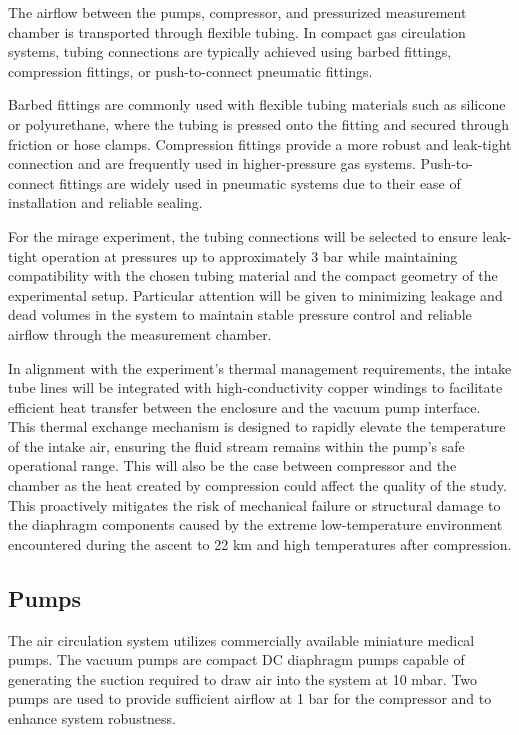 \documentclass[
  a4paper,
  11pt,
  openany,
  parskip,
  toc=totoc,
  listof=totoc,
  bibliography=totoc
]{scrreprt}
\begin{document}
The airflow between the pumps, compressor, and pressurized measurement chamber is transported through flexible tubing. In compact gas circulation systems, tubing connections are typically achieved using barbed fittings, compression fittings, or push-to-connect pneumatic fittings.

Barbed fittings are commonly used with flexible tubing materials such as silicone or polyurethane, where the tubing is pressed onto the fitting and secured through friction or hose clamps. Compression fittings provide a more robust and leak-tight connection and are frequently used in higher-pressure gas systems. Push-to-connect fittings are widely used in pneumatic systems due to their ease of installation and reliable sealing.

For the \gls{mirage} experiment, the tubing connections will be selected to ensure leak-tight operation at pressures up to approximately 3 bar while maintaining compatibility with the chosen tubing material and the compact geometry of the experimental setup. Particular attention will be given to minimizing leakage and dead volumes in the system to maintain stable pressure control and reliable airflow through the measurement chamber.

In alignment with the experiment's thermal management requirements, the intake tube lines will be integrated with high-conductivity copper windings to facilitate efficient heat transfer between the enclosure and the vacuum pump interface. This thermal exchange mechanism is designed to rapidly elevate the temperature of the intake air, ensuring the fluid stream remains within the pump's safe operational range. This will also be the case between compressor and the chamber as the heat created by compression could affect the quality of the study. This proactively mitigates the risk of mechanical failure or structural damage to the diaphragm components caused by the extreme low-temperature environment encountered during the ascent to 22 km and high temperatures after compression.

\subsection{Pumps}

The air circulation system utilizes commercially available miniature medical pumps. The vacuum pumps are compact DC diaphragm pumps capable of generating the suction required to draw air into the system at 10 mbar. Two pumps are used to provide sufficient airflow at 1 bar for the compressor and to enhance system robustness.
\end{document}
